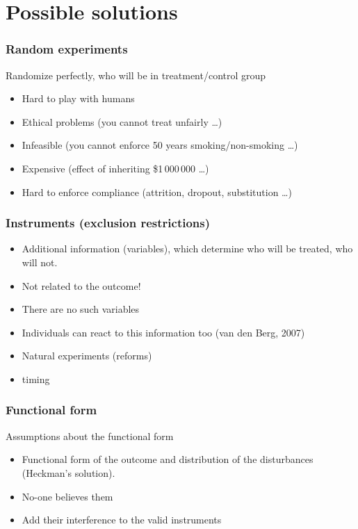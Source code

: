 \documentclass{beamer}
\begin{document}
\section[Solutions]{Possible solutions}

\begin{frame}
  \frametitle{Random experiments}

  Randomize perfectly, who will be in treatment/control group
  \pause
  \begin{itemize}
  \item Hard to play with humans
  \item Ethical problems (you cannot treat unfairly \dots)
  \item Infeasible (you cannot enforce 50 years smoking/non-smoking \dots)
  \item Expensive (effect of inheriting \$1\,000\,000 \dots)
  \item Hard to enforce compliance (attrition, dropout, substitution \dots)
  \end{itemize}
\end{frame}

\begin{frame}
  \frametitle{Instruments (exclusion restrictions)}

  \begin{itemize}
  \item Additional information (variables), which determine who will
    be treated, who will not.
  \item \alert{Not related to the outcome!}
  \end{itemize}
  
  \pause
  \begin{itemize}
  \item There are no such variables
  \item Individuals can react to this information too (van den Berg, 2007)
  \item Natural experiments (reforms)
  \item timing
  \end{itemize}
\end{frame}

\begin{frame}
  \frametitle{Functional form}
  
  Assumptions about the functional form

  \pause
  \begin{itemize}
  \item Functional form of the outcome and distribution of the
    disturbances (Heckman's solution).
  \item No-one believes them
  \item Add their interference to the valid instruments
  \end{itemize}
\end{frame}
\end{document}
